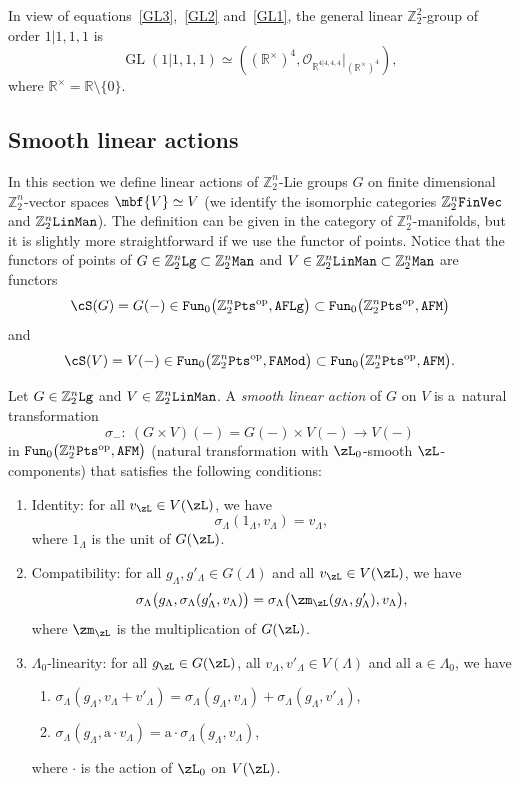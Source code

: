 \documentclass[10pt,a4paper]{amsart}
\newcommand{\op}[1]{\operatorname{#1}}
\newcommand{\R}{{\mathbb R}}
\newcommand{\Z}{{\mathbb Z}}
\def\cO{\mathcal{O}}
\newcommand{\0}{\otimes}
\newcommand{\z}{\Z_2^n}
\numberwithin{equation}{section}
\begin{document}
\begin{Example}
In view of equations~\eqref{GL3},~\eqref{GL2} and~\eqref{GL1}, the general linear $\Z^2_2$-group of order $1|1,1,1$ is
\[
\op{GL}(1|1,1,1) \simeq \left((\R^\times)^4, \cO_{\R^{4|4,4,4}}|_{(\R^\times)^4}\right),
\]
where $\R^\times=\R\setminus\{0\}$. \end{Example}
%
\subsection{Smooth linear actions}\label{SubSec:SmoLinAct} In this section we define linear actions of $\z$-Lie groups $G$ on finite dimensional $\z$-vector spaces $\mbf{V}\simeq V$ (we identify the isomorphic categories $\z{\tt FinVec}$ and $\z{\tt LinMan}$). The definition can be given in the category of $\z$-manifolds, but it is slightly more straightforward if we use the functor of points. Notice that the functors of points of $G\in\z{\tt Lg}\subset\z{\tt Man}$ and $V\in\z{\tt LinMan}\subset\z{\tt Man}$ are functors
\[
\cS(G)=G(-)\in{\tt Fun}_0\big(\z{\tt Pts}^{\op{op}},{\tt AFLg}\big)\subset{\tt Fun}_0\big(\z{\tt Pts}^{\op{op}},{\tt AFM}\big)
\]
and
\[
\cS(V)=V(-)\in{\tt Fun}_0\big(\z{\tt Pts}^{\op{op}},{\tt FAMod}\big)\subset{\tt Fun}_0\big(\z{\tt Pts}^{\op{op}},{\tt AFM}\big).
\]

\begin{Definition}\label{SmoLinActDef}
Let $G\in\z{\tt Lg}$ and $V\in\z{\tt LinMan}$. A \emph{smooth linear action} of $G$ on $V$ is a~natural transformation
\[
\sigma_{-} \colon\ (G\times V)(-)=G(-) \times V(-) \rightarrow V(-)
\]
in ${\tt Fun}_0\big(\z{\tt Pts}^{\op{op}},{\tt AFM}\big)$ (natural transformation with $\zL_0$-smooth $\zL$-components) that satisfies the following conditions:
%
\begin{enumerate}\itemsep=0pt
\item[$(i)$] Identity: for all $v_\zL\in V(\zL)$, we have
\[
\sigma_\Lambda(1_\Lambda, v_\Lambda) = v_\Lambda,
\]
where $1_\Lambda$ is the unit of $G(\zL)$. %
\item[$(ii)$] Compatibility: for all $g_\Lambda, g'_\Lambda \in G(\Lambda)$ and all $v_\zL\in V(\zL)$, we have
\[
\sigma_\Lambda\big(g_\Lambda, \sigma_\Lambda(g'_\Lambda, v_\Lambda)\big) = \sigma_\Lambda\big(\zm_\zL(g_\Lambda, g'_\Lambda),v_\Lambda\big),
\]
where $\zm_\zL$ is the multiplication of $G(\zL)$. %
\item[$(iii)$] $\Lambda_0$-linearity: for all $g_\zL\in G(\zL)$, all $v_\Lambda, v'_\Lambda \in V(\Lambda)$ and all $\mathrm{a} \in \Lambda_0$, we have
%
\begin{enumerate}\itemsep=0pt
\item[$(a)$] $\sigma_\Lambda(g_\Lambda, v_\Lambda + v'_\Lambda) = \sigma_\Lambda(g_\Lambda, v_\Lambda) + \sigma_\Lambda(g_\Lambda, v'_\Lambda)$,
\item[$(b)$] $\sigma_\Lambda (g_\Lambda, \mathrm a\cdot v_\Lambda) = \mathrm{a} \cdot \sigma_\Lambda(g_\Lambda , v_\Lambda)$,
 \end{enumerate}
where $\cdot$ is the action of $\zL_0$ on $V(\zL)$. \end{enumerate}
\end{Definition}
\end{document}
